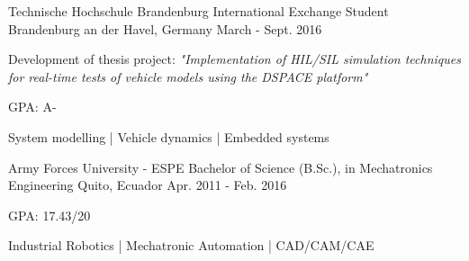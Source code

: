 
\begin{cventries}

  \cventry
    {Technische Hochschule Brandenburg}
    {International Exchange Student}
    {Brandenburg an der Havel, Germany}
    {March - Sept. 2016}
    {
      \begin{cvitems}
        \item {Development of thesis project: \textit{"Implementation of HIL/SIL simulation techniques for real-time tests of vehicle models using the DSPACE platform"}}
        \item {GPA: A-}
        \item {System modelling  |  Vehicle dynamics  |  Embedded systems}
      \end{cvitems}
    }

  \cventry
    {Army Forces University - ESPE}
    {Bachelor of Science (B.Sc.), in Mechatronics Engineering}
    {Quito, Ecuador}
    {Apr. 2011 - Feb. 2016}
    {
      \begin{cvitems}
        \item {GPA: 17.43/20}
        \item {Industrial Robotics  |  Mechatronic Automation  |  CAD/CAM/CAE}
      \end{cvitems}
    }
    
    
\end{cventries}
